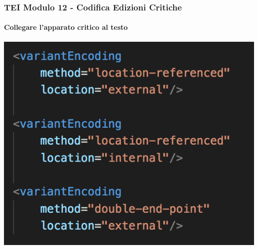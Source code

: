 \begin{frame}
    \frametitle{TEI Modulo 12 - Codifica Edizioni Critiche}
    \framesubtitle{Collegare l'apparato critico al testo}
    \addtocounter{nframe}{1}
    

    \begin{center}
       \includegraphics[width=.85\textwidth]{imgs/variantEncoding.png}
    \end{center}

\end{frame}



